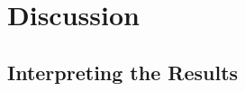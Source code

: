 \documentclass[12pt,a4paper,oneside]{article}
\begin{document}
\newpage
\section{Discussion}\label{sec:discussion}



\subsection{Interpreting the Results}\label{subsec:disc_results}

%
\end{document}
